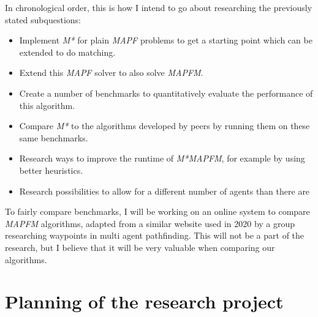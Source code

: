 \documentclass[english]{article}
\begin{document}
In chronological order, this is how I intend to go about researching the previously stated subquestions:

\begin{itemize}
    \item Implement \textit{M*} for plain \textit{MAPF} problems to get a starting point which can be extended to do matching.
    \item Extend this \textit{MAPF} solver to also solve \textit{MAPFM}.
    \item Create a number of benchmarks to quantitatively evaluate the performance of this algorithm.
    \item Compare \textit{M*} to the algorithms developed by peers by running them on these same benchmarks.
    \item Research ways to improve the runtime of \textit{M*MAPFM}, for example by using better heuristics.
    \item Research possibilities to allow for a different number of agents than there are
\end{itemize}

To fairly compare benchmarks, I will be working on an online system to compare \textit{MAPFM} algorithms, adapted from a similar website used in 2020 by a group researching waypoints in multi agent pathfinding. This will not be a part of the research, but I believe that it will be very valuable when comparing our algorithms.

\section{Planning of the research project}
\end{document}
